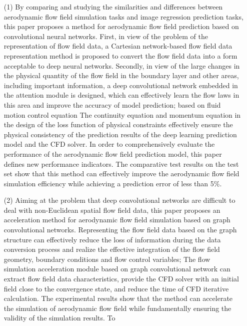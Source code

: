 \begin{eabstract}
\begin{itemize}
	\item[(1)] By comparing and studying the similarities and differences between aerodynamic flow field simulation tasks and image regression prediction tasks, this paper proposes a method for aerodynamic flow field prediction based on convolutional neural networks. First, in view of the problem of the representation of flow field data, a Cartesian network-based flow field data representation method is proposed to convert the flow field data into a form acceptable to deep neural networks.
	Secondly, in view of the large changes in the physical quantity of the flow field in the boundary layer and other areas, including important information, a deep convolutional network embedded in the attention module is designed, which can effectively learn the flow laws in this area and improve the accuracy of model prediction; based on fluid motion control equation The continuity equation and momentum equation in the design of the loss function of physical constraints effectively ensure the physical consistency of the prediction results of the deep learning prediction model and the CFD solver. In order to comprehensively evaluate the performance of the aerodynamic flow field prediction model, this paper defines new performance indicators. The comparative test results on the test set show that this method can effectively improve the aerodynamic flow field simulation efficiency while achieving a prediction error of less than 5\%.
	\item[(2)] Aiming at the problem that deep convolutional networks are difficult to deal with non-Euclidean spatial flow field data, this paper proposes an acceleration method for aerodynamic flow field simulation based on graph convolutional networks.
	Representing the flow field data based on the graph structure can effectively reduce the loss of information during the data conversion process and realize the effective integration of the flow field geometry, boundary conditions and flow control variables;
	The flow simulation acceleration module based on graph convolutional network can extract flow field data characteristics, provide the CFD solver with an initial field close to the convergence state, and reduce the time of CFD iterative calculation.
	The experimental results show that the method can accelerate the simulation of aerodynamic flow field while fundamentally ensuring the validity of the simulation results.
	To
\end{itemize}


\end{eabstract}
